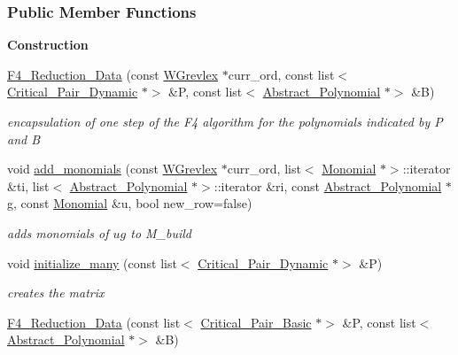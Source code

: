 \subsubsection*{Public Member Functions}
\begin{Indent}\textbf{ Construction}\par
\begin{DoxyCompactItemize}
\item 
\hyperlink{group___g_b_computation_ab908becf5415be27dd0d4e4391ee2c3b}{F4\+\_\+\+Reduction\+\_\+\+Data} (const \hyperlink{group__orderinggroup_class_w_grevlex}{W\+Grevlex} $\ast$curr\+\_\+ord, const list$<$ \hyperlink{group___g_b_computation_class_critical___pair___dynamic}{Critical\+\_\+\+Pair\+\_\+\+Dynamic} $\ast$$>$ \&P, const list$<$ \hyperlink{group__polygroup_class_abstract___polynomial}{Abstract\+\_\+\+Polynomial} $\ast$$>$ \&B)
\begin{DoxyCompactList}\small\item\em encapsulation of one step of the F4 algorithm for the polynomials indicated by {\ttfamily P} and {\ttfamily B} \end{DoxyCompactList}\item 
void \hyperlink{group___g_b_computation_a2096fe45e5eecc1c855acb82787f2719}{add\+\_\+monomials} (const \hyperlink{group__orderinggroup_class_w_grevlex}{W\+Grevlex} $\ast$curr\+\_\+ord, list$<$ \hyperlink{group__polygroup_class_monomial}{Monomial} $\ast$$>$\+::iterator \&ti, list$<$ \hyperlink{group__polygroup_class_abstract___polynomial}{Abstract\+\_\+\+Polynomial} $\ast$$>$\+::iterator \&ri, const \hyperlink{group__polygroup_class_abstract___polynomial}{Abstract\+\_\+\+Polynomial} $\ast$g, const \hyperlink{group__polygroup_class_monomial}{Monomial} \&u, bool new\+\_\+row=false)
\begin{DoxyCompactList}\small\item\em adds monomials of $ ug $ to {\ttfamily M\+\_\+build} \end{DoxyCompactList}\item 
void \hyperlink{group___g_b_computation_a9fa6a212375b9498ca86a2c18e94ca1e}{initialize\+\_\+many} (const list$<$ \hyperlink{group___g_b_computation_class_critical___pair___dynamic}{Critical\+\_\+\+Pair\+\_\+\+Dynamic} $\ast$$>$ \&P)
\begin{DoxyCompactList}\small\item\em creates the matrix \end{DoxyCompactList}\item 
\hyperlink{group___g_b_computation_ada9c61c0f75be4a2b3dd5c762c1c9a1b}{F4\+\_\+\+Reduction\+\_\+\+Data} (const list$<$ \hyperlink{group___g_b_computation_class_critical___pair___basic}{Critical\+\_\+\+Pair\+\_\+\+Basic} $\ast$$>$ \&P, const list$<$ \hyperlink{group__polygroup_class_abstract___polynomial}{Abstract\+\_\+\+Polynomial} $\ast$$>$ \&B)
$$
\end{DoxyCompactItemize}
\end{Indent}
